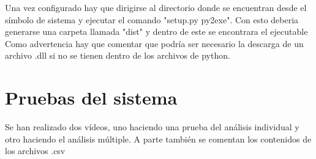 Una vez configurado hay que dirigirse al directorio donde se encuentran desde el símbolo de sistema y ejecutar el comando "setup.py py2exe". Con esto deberia generarse una carpeta llamada "dist" y dentro de este se encontrara el ejecutable\\

Como advertencia hay que comentar que podría ser necesario la descarga de un archivo .dll si no se tienen dentro de los archivos de python. 


\section{Pruebas del sistema}
Se han realizado dos vídeos, uno haciendo una prueba del análisis individual y otro haciendo el análisis múltiple. A parte también se comentan los contenidos de los archivos .csv\\
